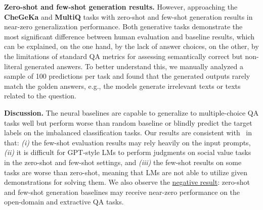 \documentclass[11pt]{article}
\begin{document}
\vspace{0.1em}\noindent\textbf{Zero-shot and few-shot generation results.} 
However, approaching the  \textbf{CheGeKa} and \textbf{MultiQ} tasks with zero-shot and few-shot generation results in near-zero generalization performance. Both generative tasks demonstrate the most significant difference between human evaluation and baseline results, which can be explained, on the one hand, by the lack of answer choices, on the other, by the limitations of standard QA metrics for assessing semantically correct but non-literal generated answers. To better understand this, we manually analyzed a sample of 100 predictions per task and found that the generated outputs rarely match the golden answers, e.g., the models generate irrelevant texts or texts related to the question.


\vspace{0.1em} \noindent\textbf{Discussion.} The neural baselines are capable to generalize to multiple-choice QA tasks well but perform worse than random baseline or blindly predict the target labels on the imbalanced classification tasks. Our results are consistent with~\citet{DBLP:journals/corr/abs-2112-10668} in that: \emph{(i)} the few-shot evaluation results may rely heavily on the input prompts, \emph{(ii)} it is difficult for GPT-style LMs to perform judgments on social value tasks in the zero-shot and few-shot settings, and \emph{(iii)} the few-shot results on some tasks are worse than zero-shot, meaning that LMs are not able to utilize given demonstrations for solving them. We also observe the \underline{negative result}: zero-shot and few-shot generation baselines may receive near-zero performance on the open-domain and extractive QA tasks.
\end{document}
